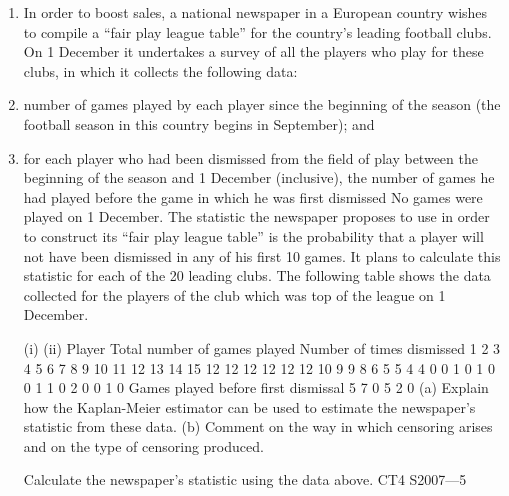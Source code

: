 \documentclass[a4paper,12pt]{article}
\begin{document}
\begin{enumerate}
\item In order to boost sales, a national newspaper in a European country wishes to compile
a “fair play league table” for the country’s leading football clubs. On 1 December it
undertakes a survey of all the players who play for these clubs, in which it collects the
following data:
\item number of games played by each player since the beginning of the season (the
football season in this country begins in September); and
\item for each player who had been dismissed from the field of play between the
beginning of the season and 1 December (inclusive), the number of games he had
played before the game in which he was first dismissed
No games were played on 1 December.
The statistic the newspaper proposes to use in order to construct its “fair play league
table” is the probability that a player will not have been dismissed in any of his first
10 games. It plans to calculate this statistic for each of the 20 leading clubs.
The following table shows the data collected for the players of the club which was top
of the league on 1 December.

(i)
(ii)
Player Total number
of games played Number of times
dismissed
1
2
3
4
5
6
7
8
9
10
11
12
13
14
15 12
12
12
12
12
12
10
9
9
8
6
5
5
4
4 0
0
1
0
1
0
0
1
1
0
2
0
0
1
0
Games
played before
first dismissal
5
7
0
5
2
0
(a) Explain how the Kaplan-Meier estimator can be used to estimate the
newspaper’s statistic from these data.
(b) Comment on the way in which censoring arises and on the type of
censoring produced.

Calculate the newspaper’s statistic using the data above.
CT4 S2007—5


\end{enumerate}
\end{document}

